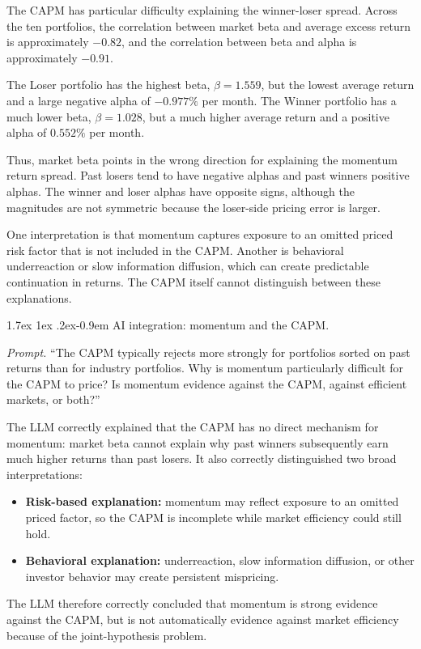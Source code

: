 \documentclass[11pt]{article}
\makeatletter
\renewcommand\paragraph{\@startsection{paragraph}{4}{0pt}%
  {1.7ex \@plus 1ex \@minus .2ex}{-0.9em}%
  {\normalfont\bfseries\normalsize\color{psink}}}
\makeatother
\begin{document}
The CAPM has particular difficulty explaining the winner-loser spread.
Across the ten portfolios, the correlation between market beta and average
excess return is approximately $-0.82$, and the correlation between beta and
alpha is approximately $-0.91$.

The Loser portfolio has the highest beta, $\beta=1.559$, but the lowest
average return and a large negative alpha of $-0.977\%$ per month. The
Winner portfolio has a much lower beta, $\beta=1.028$, but a much higher
average return and a positive alpha of $0.552\%$ per month.

Thus, market beta points in the wrong direction for explaining the momentum
return spread. Past losers tend to have negative alphas and past winners
positive alphas. The winner and loser alphas have opposite signs, although
the magnitudes are not symmetric because the loser-side pricing error is
larger.

One interpretation is that momentum captures exposure to an omitted priced
risk factor that is not included in the CAPM. Another is behavioral
underreaction or slow information diffusion, which can create predictable
continuation in returns. The CAPM itself cannot distinguish between these
explanations.

\paragraph{AI integration: momentum and the CAPM.}

\textit{Prompt.} ``The CAPM typically rejects more strongly for portfolios
sorted on past returns than for industry portfolios. Why is momentum
particularly difficult for the CAPM to price? Is momentum evidence against
the CAPM, against efficient markets, or both?''

The LLM correctly explained that the CAPM has no direct mechanism for
momentum: market beta cannot explain why past winners subsequently earn much
higher returns than past losers. It also correctly distinguished two broad
interpretations:
\begin{itemize}
\setlength{\itemsep}{2pt}\setlength{\parskip}{0pt}
\item \textbf{Risk-based explanation:} momentum may reflect exposure to an
omitted priced factor, so the CAPM is incomplete while market efficiency
could still hold.
\item \textbf{Behavioral explanation:} underreaction, slow information
diffusion, or other investor behavior may create persistent mispricing.
\end{itemize}
The LLM therefore correctly concluded that momentum is strong evidence
against the CAPM, but is not automatically evidence against market
efficiency because of the joint-hypothesis problem.
\end{document}
